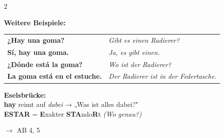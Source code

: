 \documentclass[11pt, a4paper]{article}
\newcommand{\seriftext}[1]{{\fontfamily{ppl}\selectfont #1}}
\newcommand{\es}[1]{\seriftext{\textbf{#1}}}
\newcommand{\de}[1]{\textit{\textcolor{akzent}{#1}}}
\newcommand{\abmark}[1]{{\footnotesize\textcolor{akzent}{$\rightarrow$ AB #1}}}
\begin{document}
\vspace{6pt}

\begin{multicols}{2}

\textbf{Weitere Beispiele:}

{\small
\begin{tabular}{@{}p{5.8cm}l@{}}
\es{¿Hay una goma?} & \de{Gibt es einen Radierer?} \\[0.3em]
\es{Sí, hay una goma.} & \de{Ja, es gibt einen.} \\[0.3em]
\es{¿Dónde está la goma?} & \de{Wo ist der Radierer?} \\[0.3em]
\es{La goma está en el estuche.} & \de{Der Radierer ist in der Federtasche.} \\
\end{tabular}}

\columnbreak

\begin{tippbox}
\footnotesize\textbf{Eselsbrücke:}\\[2pt]
\textbf{hay} reimt auf \textit{dabei} → „Was ist alles dabei?"\\
\textbf{ESTAR} = \textbf{E}xakter \textbf{STA}ndo\textbf{R}t \de{(Wo genau?)}
\end{tippbox}

\end{multicols}

\abmark{4, 5}


\vspace{6pt}
\end{document}
